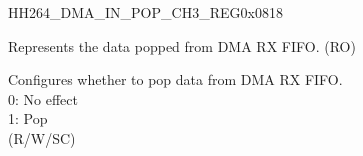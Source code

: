     
    \begin{register}{H}{H264\_DMA\_IN\_POP\_CH3\_REG}{0x0818}\label{regdesc:H264DMAINPOPCH3REG}
    \regnewline%
    \begin{regdesc}\begin{reglist}
    \label{fielddesc:H264DMAINFIFORDATACH3}\item [H264\_DMA\_INFIFO\_RDATA\_CH3] Represents the data popped from DMA RX FIFO. (RO)
    \label{fielddesc:H264DMAINFIFOPOPCH3}\item [H264\_DMA\_INFIFO\_POP\_CH3] Configures whether to pop data from DMA RX FIFO.\\
    0: No effect\\
    1: Pop\\ (R/W/SC)
    \end{reglist}\end{regdesc}
    \end{register}
    

